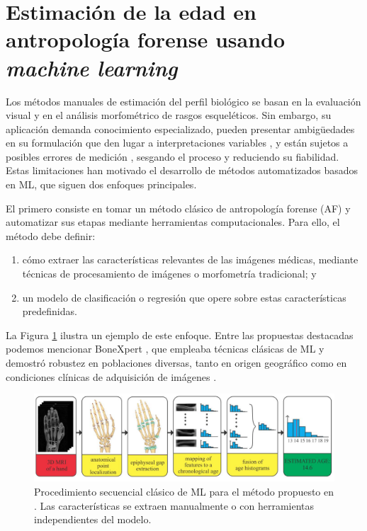 
\section{Estimación de la edad en antropología forense usando \textit{machine learning}}

Los métodos manuales de estimación del perfil biológico se basan en la evaluación visual y en el análisis 
morfométrico de rasgos esqueléticos. Sin embargo, su aplicación demanda conocimiento especializado, pueden 
presentar ambigüedades en su formulación que den lugar a interpretaciones variables \cite{berst2001}, y están 
sujetos a posibles errores de medición \cite{langley2018}, sesgando el proceso y reduciendo su fiabilidad.
Estas limitaciones han motivado el desarrollo de métodos automatizados basados en ML, que siguen dos enfoques
principales. 

El primero consiste en tomar un método clásico de antropología forense (AF) y automatizar sus 
etapas mediante herramientas computacionales. Para ello, el método debe definir:

\begin{enumerate}
    
    \item cómo extraer las características relevantes de las imágenes médicas, mediante técnicas de 
    procesamiento de imágenes o morfometría tradicional; y

    \item un modelo de clasificación o regresión que opere sobre estas características predefinidas.

\end{enumerate}

La Figura \ref{fig:MRI_pipeline} ilustra un ejemplo de este enfoque. Entre las propuestas destacadas 
podemos mencionar BoneXpert \cite{thodberg2008}, que empleaba técnicas clásicas de ML y demostró robustez 
en poblaciones diversas, tanto en origen geográfico como en condiciones clínicas de adquisición de 
imágenes \cite{van2009, martin2010, thodberg2010}. 

\begin{figure}[h]
    \centering
    \includegraphics[width=\textwidth]{capitulos/cap_01/imagenes/MRI_pipeline.png}
    \caption[
        Procedimiento secuencial clásico de ML para el método propuesto en \cite{stern2014}.
    ]{
        Procedimiento secuencial clásico de ML para el método propuesto en \cite{stern2014}. 
        Las características se extraen manualmente o con herramientas independientes del modelo.
    }
    \label{fig:MRI_pipeline}
\end{figure}

